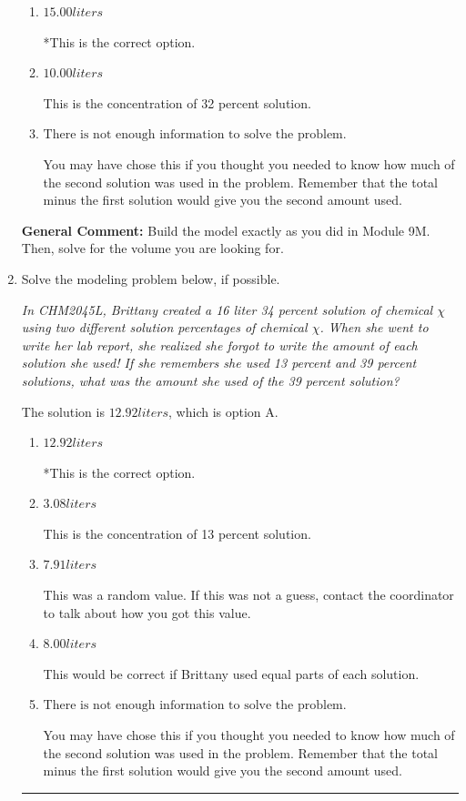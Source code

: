 \documentclass{extbook}[14pt]
\newcommand{\litem}[1]{\item #1

\rule{\textwidth}{0.4pt}}
\begin{document}
\begin{enumerate}
{\begin{enumerate}[label=\Alph*.]
This was a random value. If this was not a guess, contact the coordinator to talk about how you got this value.
\item \( 15.00 liters \)

*This is the correct option.
\item \( 10.00 liters \)

This is the concentration of 32 percent solution.
\item \( \text{There is not enough information to solve the problem.} \)

You may have chose this if you thought you needed to know how much of the second solution was used in the problem. Remember that the total minus the first solution would give you the second amount used.
\end{enumerate}

\textbf{General Comment:} Build the model exactly as you did in Module 9M. Then, solve for the volume you are looking for.
}
\litem{
Solve the modeling problem below, if possible.

\begin{center}
    \textit{ In CHM2045L, Brittany created a 16 liter 34 percent solution of chemical $\chi$ using two different solution percentages of chemical $\chi$. When she went to write her lab report, she realized she forgot to write the amount of each solution she used! If she remembers she used 13 percent and 39 percent solutions, what was the amount she used of the 39 percent solution? }
\end{center}
The solution is \( 12.92 liters \), which is option A.\begin{enumerate}[label=\Alph*.]
\item \( 12.92 liters \)

*This is the correct option.
\item \( 3.08 liters \)

This is the concentration of 13 percent solution.
\item \( 7.91 liters \)

This was a random value. If this was not a guess, contact the coordinator to talk about how you got this value.
\item \( 8.00 liters \)

This would be correct if Brittany used equal parts of each solution.
\item \( \text{There is not enough information to solve the problem.} \)

You may have chose this if you thought you needed to know how much of the second solution was used in the problem. Remember that the total minus the first solution would give you the second amount used.
\end{enumerate}

}
\end{enumerate}
\end{document}
